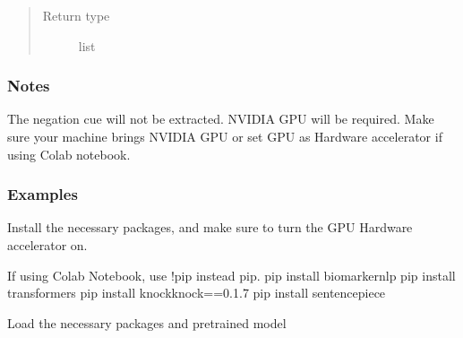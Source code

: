 \documentclass[letterpaper,10pt,english]{sphinxmanual}
\begin{document}
\begin{fulllineitems}
\begin{quote}
\begin{description}
\item[{Return type}] \leavevmode
\sphinxAtStartPar
list

\end{description}\end{quote}


\nopagebreak


\sphinxAtStartPar
{\hyperref[\detokenize{negation_cue_scope:negation_cue_scope.negation_detect}]{}}


\subsubsection*{Notes}

\sphinxAtStartPar
The negation cue will not be extracted.
NVIDIA GPU will be required. Make sure your machine brings NVIDIA GPU or set GPU as Hardware accelerator if using Colab notebook.
\subsubsection*{Examples}

\sphinxAtStartPar
Install the necessary packages, and make sure to turn the GPU Hardware accelerator on.

\begin{sphinxVerbatim}[commandchars=\\\{\}]
\PYGZgt{}\PYGZgt{}\PYGZgt{} If using Colab Notebook, use !pip instead pip.
\PYGZdl{} pip install biomarker\PYGZus{}nlp
\PYGZdl{} pip install transformers
\PYGZdl{} pip install knockknock==0.1.7
\PYGZdl{} pip install sentencepiece
\end{sphinxVerbatim}

\sphinxAtStartPar
Load the necessary packages and pre\sphinxhyphen{}trained model

\begin{sphinxVerbatim}[commandchars=\\\{\}]
   
    
   
   
\end{sphinxVerbatim}


\end{fulllineitems}
\end{document}
